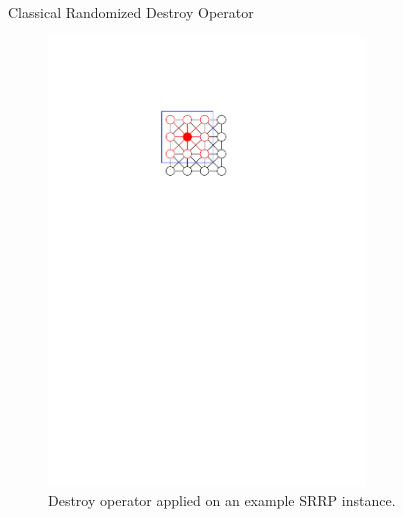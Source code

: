 \documentclass[aspectratio=1610]{beamer}
\begin{document}
\begin{frame}{Classical Randomized Destroy Operator}
\begin{figure}
\begin{overprint}
			\centering\includegraphics[width=0.75\textwidth, page=16]{graphics/graphics.pdf}
		\end{overprint}
		\caption{Destroy operator applied on an example SRRP instance.}
	\end{figure}
\end{frame}
\end{document}
